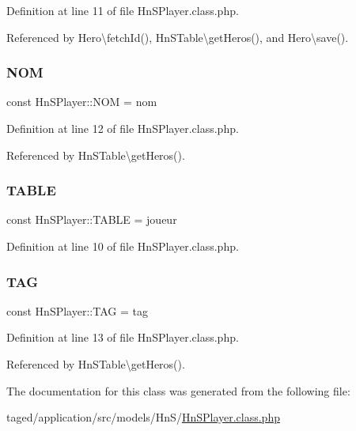 Definition at line 11 of file Hn\+S\+Player.\+class.\+php.



Referenced by Hero\textbackslash{}fetch\+Id(), Hn\+S\+Table\textbackslash{}get\+Heros(), and Hero\textbackslash{}save().

\mbox{\label{class_hn_s_player_a84b544511744bdacc05d361f41a530d0}} 
\subsubsection{\texorpdfstring{N\+OM}{NOM}}
{\footnotesize\ttfamily const Hn\+S\+Player\+::\+N\+OM = \textquotesingle{}nom\textquotesingle{}}



Definition at line 12 of file Hn\+S\+Player.\+class.\+php.



Referenced by Hn\+S\+Table\textbackslash{}get\+Heros().

\mbox{\label{class_hn_s_player_ab8e3041974f3ced4cbcd303b51af7491}} 
\subsubsection{\texorpdfstring{T\+A\+B\+LE}{TABLE}}
{\footnotesize\ttfamily const Hn\+S\+Player\+::\+T\+A\+B\+LE = \textquotesingle{}joueur\textquotesingle{}}



Definition at line 10 of file Hn\+S\+Player.\+class.\+php.

\mbox{\label{class_hn_s_player_ab2d0bf564b744bd001dc61e64b9608c0}} 
\subsubsection{\texorpdfstring{T\+AG}{TAG}}
{\footnotesize\ttfamily const Hn\+S\+Player\+::\+T\+AG = \textquotesingle{}tag\textquotesingle{}}



Definition at line 13 of file Hn\+S\+Player.\+class.\+php.



Referenced by Hn\+S\+Table\textbackslash{}get\+Heros().



The documentation for this class was generated from the following file\+:\begin{DoxyCompactItemize}
\item 
taged/application/src/models/\+Hn\+S/\hyperlink{_hn_s_player_8class_8php}{Hn\+S\+Player.\+class.\+php}\end{DoxyCompactItemize}
